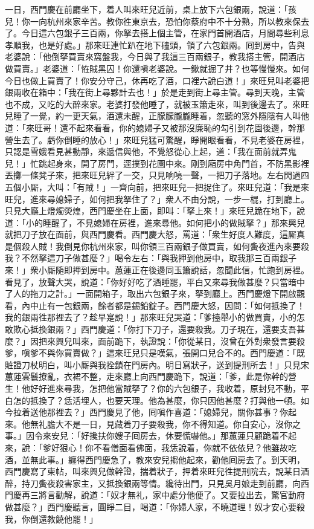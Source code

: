 一日，西門慶在前廳坐下，着人叫來旺兒近前，桌上放下六包銀兩，說道：「孩兒！你一向杭州來家辛苦。教你徃東京去，恐怕你蔡府中不十分熟，所以教來保去了。今日這六包銀子三百兩，你拏去搭上個主管，在家門首開酒店，月間尋些利息孝順我，也是好處。」那來旺連忙趴在地下磕頭，領了六包銀兩。囘到房中，告與老婆說：「他倒拏買賣來窩盤我，今日與了我這三百兩銀子，教我搭主管，開酒店做買賣。」老婆道：「恠賊黑囚！你還嗔老婆說。一鍬就掘了井？也等慢慢來。如何今日也做上買賣了！你安分守己，休再吃了酒，口裡六說白道！」來旺兒叫老婆把銀兩收在箱中：「我在街上尋夥計去也！」於是走到街上尋主管。尋到天晚，主管也不成，又吃的大醉來家。老婆打發他睡了，就被玉簫走來，叫到後邊去了。來旺兒睡了一覺，約一更天氣，酒還未醒，正朦朦朧朧睡着，忽聽的窓外隱隱有人叫他道：「來旺哥！還不起來看看，你的媳婦子又被那沒廉恥的勾引到花園後邊，幹那營生去了。虧你倒睡的放心！」{}來旺兒猛可驚醒，睜開眼看看，不見老婆在房裡，只認是雪娥看見甚動靜，來遞信與他，不覺怒從心上起，道：「我在面前就弄鬼兒！」忙跳起身來，開了房門，逕撲到花園中來。剛到廂房中角門首，不防黑影裡丟擲一條凳子來，把來旺兒絆了一交，只見响喨一聲，一把刀子落地。左右閃過四五個小厮，大叫：「有賊！」一齊向前，把來旺兒一把捉住了。來旺兒道：「我是來旺兒，進來尋媳婦子，如何把我拏住了？」衆人不由分說，一步一棍，打到廳上。只見大廳上燈燭熒煌，西門慶坐在上面，即叫：「拏上來！」來旺兒跪在地下，說道：「小的睡醒了，不見媳婦在房裡，進來尋他。如何把小的做賊拏？」那來興兒就把刀子放在面前，與西門慶看。西門慶大怒，罵道：「衆生好度人難度，這厮真是個殺人賊！我倒見你杭州來家，叫你領三百兩銀子做買賣，如何夤夜進內來要殺我？不然拏這刀子做甚麼？」喝令左右：「與我押到他房中，取我那三百兩銀子來！」衆小厮隨即押到房中。蕙蓮正在後邊同玉簫說話，忽聞此信，忙跑到房裡。看見了，放聲大哭，說道：「你好好吃了酒睡罷，平白又來尋我做甚麼？只當暗中了人的拖刀之計。」一面開箱子，取出六包銀子來，拏到廳上。西門慶燈下開啟觀看，內中止有一包銀兩，餘者都是錫鉛錠子。西門慶大怒，因問：「如何抵換了！我的銀兩徃那裡去了？趁早寔說！」那來旺兒哭道：「爹擡舉小的做買賣，小的怎敢欺心抵換銀兩？」西門慶道：「你打下刀子，還要殺我。刀子現在，還要支吾甚麼？」因把來興兒叫來，面前跪下，執證說：「你從某日，沒曾在外對衆發言要殺爹，嗔爹不與你買賣做？」這來旺兒只是嘆氣，張開口兒合不的。西門慶道：「既賍證刀杖明白，叫小厮與我拴鎖在門房內。明日寫狀子，送到提刑所去！」只見宋蕙蓮雲鬟撩亂，衣裙不整，走來廳上向西門慶跪下，說道：「爹，此是你幹的營生！他好好進來尋我，怎把他當賊拏了？你的六包銀子，我收着，原封兒不動，平白怎的抵換了？恁活埋人，也要天理。他為甚麼，你只因他甚麼？{}打與他一頓。如今拉着送他那裡去？」西門慶見了他，囘嗔作喜道：「媳婦兒，關你甚事？你起來。他無礼膽大不是一日，見藏着刀子要殺我，你不得知道。你自安心，沒你之事。」因令來安兒：「好攙扶你嫂子囘房去，休要慌嚇他。」{}那蕙蓮只顧跪着不起來，說：「爹好狠心！你不看僧面看佛面，我恁說着，你就不依依兒？{}他雖故吃酒，並無此事。」纏得西門慶急了，教來安兒搊他起來，勸他囘房去了。到天明，西門慶寫了柬帖，叫來興兒做幹證，揣着狀子，押着來旺兒徃提刑院去，說某日酒醉，持刀夤夜殺害家主，又抵換銀兩等情。纔待出門，只見吳月娘走到前廳，向西門慶再三將言勸解，說道：「奴才無礼，家中處分他便了。又要拉出去，驚官動府做甚麼？」西門慶聽言，圓睜二目，喝道：「你婦人家，不曉道理！奴才安心要殺我，你倒還教饒他罷！」